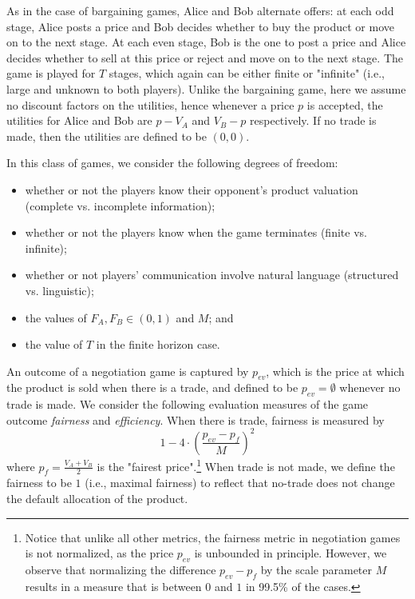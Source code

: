 As in the case of bargaining games, Alice and Bob alternate offers: at each odd stage, Alice posts a price and Bob decides whether to buy the product or move on to the next stage. At each even stage, Bob is the one to post a price and Alice decides whether to sell at this price or reject and move on to the next stage. The game is played for $T$ stages, which again can be either finite or "infinite" (i.e., large and unknown to both players). Unlike the bargaining game, here we assume no discount factors on the utilities, hence whenever a price $p$ is accepted, the utilities for Alice and Bob are $p - V_A$ and $V_B - p$ respectively. If no trade is made, then the utilities are defined to be $(0, 0)$.

In this class of games, we consider the following degrees of freedom: 

\begin{itemize}
\item[(i)] whether or not the players know their opponent's product valuation (complete vs. incomplete information);
\item[(ii)] whether or not the players know when the game terminates (finite vs. infinite);
\item[(iii)] whether or not players' communication involve natural language (structured vs. linguistic);
\item[(iv)] the values of $F_A, F_B \in (0,1)$ and $M$;
and \item[(v)] the value of $T$ in the finite horizon case.
\end{itemize}


An outcome of a negotiation game is captured by $p_{ev}$, which is the price at which the product is sold when there is a trade, and defined to be $p_{ev} = \emptyset$ whenever no trade is made.
We consider the following evaluation measures of the game outcome \emph{fairness} and \emph{efficiency}. 
When there is trade, fairness is measured by 
\[1 - 4 \cdot \left(\frac{p_{ev} - p_f}{M}\right)^2\]
where $p_f = \frac{V_A + V_B}{2}$ is the "fairest price".\footnote{Notice that unlike all other metrics, the fairness metric in negotiation games is not normalized, as the price $p_{ev}$ is unbounded in principle. However, we observe that normalizing the difference $p_{ev}-p_f$ by the scale parameter $M$ results in a measure that is between $0$ and $1$ in 99.5\% of the cases.}
When trade is not made, we define the fairness to be $1$ (i.e., maximal fairness) to reflect that no-trade does not change the default allocation of the product.

